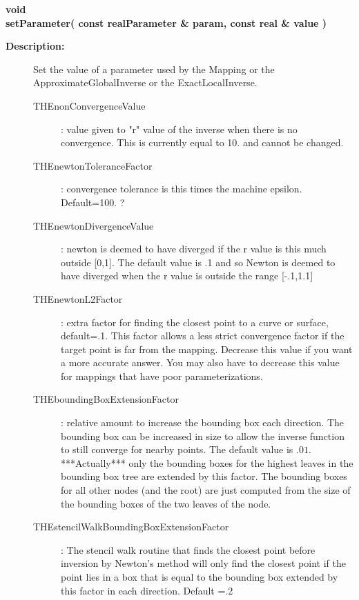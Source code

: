 \begin{flushleft} \textbf{%
void  \\ 
\settowidth{\MappingIncludeArgIndent}{setParameter(}%
setParameter( const  realParameter \& param, const real \& value ) 
}\end{flushleft}
\begin{description}
\item[{\bf Description:}] 
   Set the value of a parameter used by the Mapping or the ApproximateGlobalInverse or the ExactLocalInverse.
 
 \begin{description}
  \item[THEnonConvergenceValue] : value given to "r" value of the inverse when there is no convergence. This is
              currently equal to 10. and cannot be changed.
  \item[THEnewtonToleranceFactor] : convergence tolerance is this times the machine epsilon. Default=100. ?
  \item[THEnewtonDivergenceValue] : newton is deemed to have diverged if the r value is this much outside [0,1].
      The default value is .1 and so Newton is deemed to have diverged when the r value is outside the range 
      [-.1,1.1]
  \item[THEnewtonL2Factor] : extra factor for finding the closest point to a curve or surface, default=.1.
          This factor allows a less strict convergence factor if the target point is far from the mapping.
          Decrease this value if you want a more accurate answer. You may also have to decrease this value
          for mappings that have poor parameterizations. 
  \item[THEboundingBoxExtensionFactor] : relative amount to increase the bounding box each direction. The bounding
     box can be increased in size to allow the inverse function to still converge for nearby points. The default
     value is $.01$. ***Actually*** only the bounding boxes for the highest leaves in the bounding box tree
     are extended by this factor. The bounding boxes for all other nodes (and the root) are just computed
     from the size of the bounding boxes of the two leaves of the node.
  \item[THEstencilWalkBoundingBoxExtensionFactor] : The stencil walk routine that finds the closest point
     before inversion by Newton's method will only find the closest point if the point lies in a box
     that is equal to the bounding box extended by this factor in each direction. Default =.2
 \end{description}

 
\end{description}

